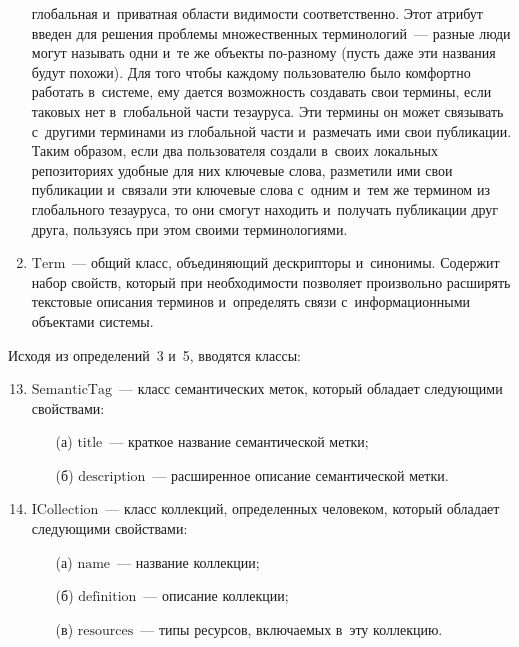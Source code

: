 \begin{multicols}{2}
\begin{enumerate}[1.]
глобальная и~приватная об\-ласти видимости соответственно. Этот атрибут 
введен для решения проблемы множественных терминологий~--- разные 
люди могут называть одни и~те же объекты по-раз\-но\-му (пусть даже эти 
названия будут похожи). Для того чтобы каж\-до\-му пользователю было 
комфортно работать в~сис\-те\-ме, ему дается возможность создавать свои 
термины, если таковых нет в~глобальной части тезауруса. Эти термины он 
может связывать с~другими терминами из глобальной части и~размечать 
ими свои публикации. Таким образом, если два пользователя создали 
в~своих локальных репозиториях удобные для них ключевые слова, 
разметили ими свои публикации и~связали эти ключевые слова с~одним 
и~тем же термином из глобального тезауруса, то они смогут находить 
и~получать публикации друг друга, пользуясь при этом своими 
терминологиями.
\item $\mathrm{Term}$~--- общий класс, объединяющий дескрипторы и~синонимы. 
Содержит набор свойств, который при необходимости позволяет 
произвольно расширять текстовые описания терминов и~определять связи 
с~информационными объектами системы.
\end{enumerate}

Исходя из определений~3 и~5, вводятся классы:
\begin{enumerate}[1.]
\setcounter{enumi}{12}
\item  $\mathrm{SemanticTag}$~--- класс семантических меток, который обладает 
следующими свойствами:
\begin{itemize}
\item[(а)] $\mathrm{title}$~--- краткое название семантической метки;
\item[(б)] $\mathrm{description}$~--- расширенное описание 
семантической метки.
\end{itemize}
\item $\mathrm{ICollection}$~--- класс коллекций, определенных человеком, 
который обладает следующими свойствами:
\begin{itemize}
\item[(а)] $\mathrm{name}$~--- название коллекции;
\item[(б)] $\mathrm{definition}$~--- описание коллекции;
\item[(в)] $\mathrm{resources}$~--- типы ресурсов, включаемых в~эту 
коллекцию.
\end{itemize}
\end{enumerate}


\end{multicols}
